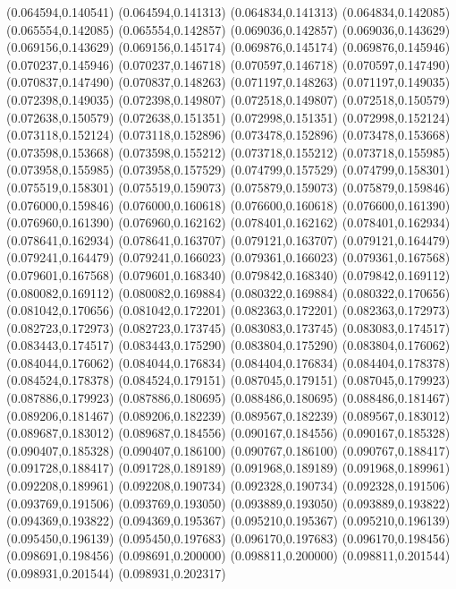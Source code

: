 (0.064594,0.140541)
(0.064594,0.141313)
(0.064834,0.141313)
(0.064834,0.142085)
(0.065554,0.142085)
(0.065554,0.142857)
(0.069036,0.142857)
(0.069036,0.143629)
(0.069156,0.143629)
(0.069156,0.145174)
(0.069876,0.145174)
(0.069876,0.145946)
(0.070237,0.145946)
(0.070237,0.146718)
(0.070597,0.146718)
(0.070597,0.147490)
(0.070837,0.147490)
(0.070837,0.148263)
(0.071197,0.148263)
(0.071197,0.149035)
(0.072398,0.149035)
(0.072398,0.149807)
(0.072518,0.149807)
(0.072518,0.150579)
(0.072638,0.150579)
(0.072638,0.151351)
(0.072998,0.151351)
(0.072998,0.152124)
(0.073118,0.152124)
(0.073118,0.152896)
(0.073478,0.152896)
(0.073478,0.153668)
(0.073598,0.153668)
(0.073598,0.155212)
(0.073718,0.155212)
(0.073718,0.155985)
(0.073958,0.155985)
(0.073958,0.157529)
(0.074799,0.157529)
(0.074799,0.158301)
(0.075519,0.158301)
(0.075519,0.159073)
(0.075879,0.159073)
(0.075879,0.159846)
(0.076000,0.159846)
(0.076000,0.160618)
(0.076600,0.160618)
(0.076600,0.161390)
(0.076960,0.161390)
(0.076960,0.162162)
(0.078401,0.162162)
(0.078401,0.162934)
(0.078641,0.162934)
(0.078641,0.163707)
(0.079121,0.163707)
(0.079121,0.164479)
(0.079241,0.164479)
(0.079241,0.166023)
(0.079361,0.166023)
(0.079361,0.167568)
(0.079601,0.167568)
(0.079601,0.168340)
(0.079842,0.168340)
(0.079842,0.169112)
(0.080082,0.169112)
(0.080082,0.169884)
(0.080322,0.169884)
(0.080322,0.170656)
(0.081042,0.170656)
(0.081042,0.172201)
(0.082363,0.172201)
(0.082363,0.172973)
(0.082723,0.172973)
(0.082723,0.173745)
(0.083083,0.173745)
(0.083083,0.174517)
(0.083443,0.174517)
(0.083443,0.175290)
(0.083804,0.175290)
(0.083804,0.176062)
(0.084044,0.176062)
(0.084044,0.176834)
(0.084404,0.176834)
(0.084404,0.178378)
(0.084524,0.178378)
(0.084524,0.179151)
(0.087045,0.179151)
(0.087045,0.179923)
(0.087886,0.179923)
(0.087886,0.180695)
(0.088486,0.180695)
(0.088486,0.181467)
(0.089206,0.181467)
(0.089206,0.182239)
(0.089567,0.182239)
(0.089567,0.183012)
(0.089687,0.183012)
(0.089687,0.184556)
(0.090167,0.184556)
(0.090167,0.185328)
(0.090407,0.185328)
(0.090407,0.186100)
(0.090767,0.186100)
(0.090767,0.188417)
(0.091728,0.188417)
(0.091728,0.189189)
(0.091968,0.189189)
(0.091968,0.189961)
(0.092208,0.189961)
(0.092208,0.190734)
(0.092328,0.190734)
(0.092328,0.191506)
(0.093769,0.191506)
(0.093769,0.193050)
(0.093889,0.193050)
(0.093889,0.193822)
(0.094369,0.193822)
(0.094369,0.195367)
(0.095210,0.195367)
(0.095210,0.196139)
(0.095450,0.196139)
(0.095450,0.197683)
(0.096170,0.197683)
(0.096170,0.198456)
(0.098691,0.198456)
(0.098691,0.200000)
(0.098811,0.200000)
(0.098811,0.201544)
(0.098931,0.201544)
(0.098931,0.202317)
